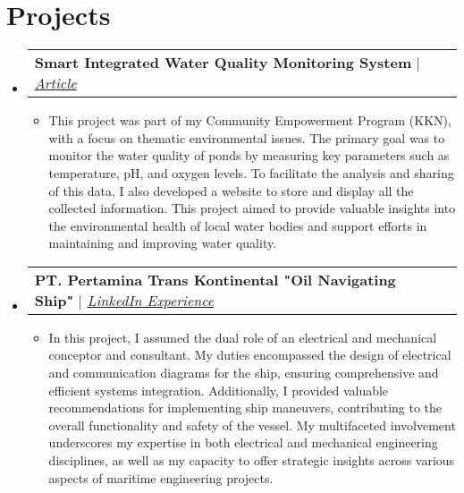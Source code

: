 \documentclass[letterpaper,11pt]{article}
\makeatletter
\newcommand{\resumeItem}[1]{
  \item\small{
    {#1 \vspace{-2pt}}
  }
}
\newcommand{\resumeProjectHeading}[2]{
    \vspace{-2pt}\item
    \begin{tabular*}{0.97\textwidth}{l@{\extracolsep{\fill}}r}
      \small#1 & #2 \\
    \end{tabular*}\vspace{-7pt}
}
\newcommand{\resumeSubHeadingListStart}{\begin{itemize}[leftmargin=0.15in, label={}]}
\newcommand{\resumeSubHeadingListEnd}{\end{itemize}}
\newcommand{\resumeItemListStart}{\begin{itemize}}
\newcommand{\resumeItemListEnd}{\end{itemize}\vspace{-5pt}}
\makeatother
\begin{document}

\section{Projects}
    \vspace{3pt}
    \resumeSubHeadingListStart            
      \resumeProjectHeading
        {\textbf{Smart Integrated Water Quality Monitoring System} $|$ \emph{\href{https://www.its.ac.id/news/2023/09/12/bantu-petambak-abmas-its-gagas-alat-pengontrol-kualitas-air/}{\color{blue}Article}}}{}
          \resumeItemListStart
            \resumeItem{This project was part of my Community Empowerment Program (KKN), with a focus on thematic environmental issues. The primary goal was to monitor the water quality of ponds by measuring key parameters such as temperature, pH, and oxygen levels. To facilitate the analysis and sharing of this data, I also developed a website to store and display all the collected information. This project aimed to provide valuable insights into the environmental health of local water bodies and support efforts in maintaining and improving water quality.}
          \resumeItemListEnd

     \resumeProjectHeading
        {\textbf{PT. Pertamina Trans Kontinental "Oil Navigating Ship"} $|$ \emph{\href{https://www.linkedin.com/in/jonathan-oktaviano/details/projects/}{\color{blue}LinkedIn Experience}}}{}
          \resumeItemListStart
            \resumeItem{In this project, I assumed the dual role of an electrical and mechanical conceptor and consultant. My duties encompassed the design of electrical and communication diagrams for the ship, ensuring comprehensive and efficient systems integration. Additionally, I provided valuable recommendations for implementing ship maneuvers, contributing to the overall functionality and safety of the vessel. My multifaceted involvement underscores my expertise in both electrical and mechanical engineering disciplines, as well as my capacity to offer strategic insights across various aspects of maritime engineering projects.}
          \resumeItemListEnd
          
    \resumeSubHeadingListEnd

    
\end{document}
